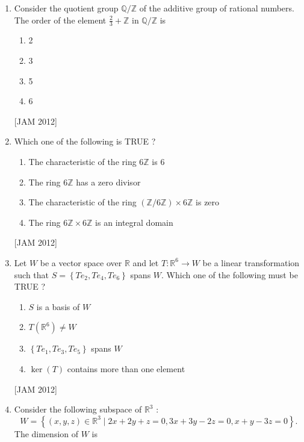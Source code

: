 \begin{enumerate}
\item  Consider the quotient group $\mathbb{Q} / \mathbb{Z}$ of the additive group of rational numbers. The order of the element $\frac{2}{3}+\mathbb{Z}$ in $\mathbb{Q} / \mathbb{Z}$ is 


\begin{enumerate}
    
\item 2 
\item 3 
\item 5 
\item 6
\end{enumerate}
\hfill [JAM 2012]


 \item  Which one of the following is TRUE ? 
 

\begin{enumerate}
    \item The characteristic of the ring $6 \mathbb{Z}$ is 6 
\item The ring $6 \mathbb{Z}$ has a zero divisor 
\item The characteristic of the ring $(\mathbb{Z} / 6 \mathbb{Z}) \times 6 \mathbb{Z}$ is zero 
\item The ring $6 \mathbb{Z} \times 6 \mathbb{Z}$ is an integral domain
\end{enumerate}
\hfill [JAM 2012]





\item  Let $W$ be a vector space over $\mathbb{R}$ and let $T: \mathbb{R}^{6} \rightarrow W$ be a linear transformation such that $S=\left\{T e_{2}, T e_{4}, T e_{6}\right\}$ spans $W$. Which one of the following must be TRUE ? 

\begin{enumerate}
\item $S$ is a basis of $W$ 
\item $T\left(\mathbb{R}^{6}\right) \neq W$ 
\item $\left\{T e_{1}, T e_{3}, T e_{5}\right\}$ spans $W$ 
\item $\operatorname{ker}(T)$ contains more than one element

\end{enumerate}
\hfill [JAM 2012]





\item  Consider the following subspace of $\mathbb{R}^{3}$ :
$$
W=\left\{(x, y, z) \in \mathbb{R}^{3} \mid 2 x+2 y+z=0,3 x+3 y-2 z=0, x+y-3 z=0\right\} .
$$
The dimension of $W$ is 



\end{enumerate}
